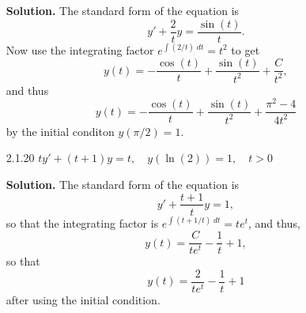 \begin{enumerate}
      \textbf{Solution.} The standard form of the equation is
      $$y' + \frac{2}{t}y = \frac{\sin(t)}{t}.$$
      Now use the integrating factor $e^{\int(2/t)\;dt} = t^2$ to get
      $$y(t) = -\frac{\cos(t)}{t} + \frac{\sin(t)}{t^2} + \frac{C}{t^2},$$
      and thus
      $$y(t) = -\frac{\cos(t)}{t} + \frac{\sin(t)}{t^2} +
                \frac{\pi^2 - 4}{4t^2}$$
      by the initial conditon $y(\pi/2) = 1$.
   \item[2.1.20]  $ty' + (t + 1)y = t, \quad y(\ln(2)) = 1, \quad t > 0$

      \textbf{Solution.} The standard form of the equation is
      $$y' + \frac{t+1}{t}y = 1,$$
      so that the integrating factor is $e^{\int(t+1/t)\;dt} = te^t$, and thus,
      $$y(t) = \frac{C}{te^t} - \frac{1}{t} + 1,$$
      so that
      $$y(t) = \frac{2}{te^t} - \frac{1}{t} + 1$$
      after using the initial condition.
\end{enumerate}
